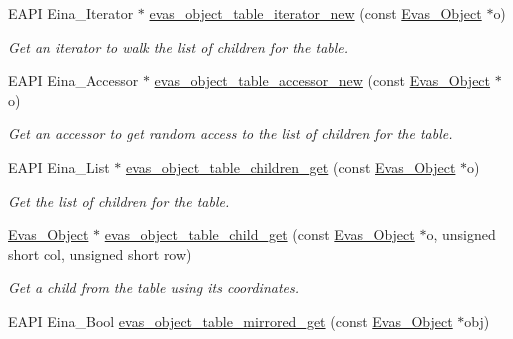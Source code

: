 \begin{DoxyCompactItemize}
EAPI Eina\_\-Iterator $\ast$ \hyperlink{group__Evas__Object__Table_ga07d18d5708745143c4b12280a7359e71}{evas\_\-object\_\-table\_\-iterator\_\-new} (const \hyperlink{group__Evas__Object__Group_ga9e19e6dd1f517a0ba437c0114d3e7c97}{Evas\_\-Object} $\ast$o)
\begin{DoxyCompactList}\small\item\em Get an iterator to walk the list of children for the table. \item\end{DoxyCompactList}\item 
EAPI Eina\_\-Accessor $\ast$ \hyperlink{group__Evas__Object__Table_gaaa6c5242faad0906b1fbf4bbc1088543}{evas\_\-object\_\-table\_\-accessor\_\-new} (const \hyperlink{group__Evas__Object__Group_ga9e19e6dd1f517a0ba437c0114d3e7c97}{Evas\_\-Object} $\ast$o)
\begin{DoxyCompactList}\small\item\em Get an accessor to get random access to the list of children for the table. \item\end{DoxyCompactList}\item 
EAPI Eina\_\-List $\ast$ \hyperlink{group__Evas__Object__Table_ga1afb562131cd3a74a130c374fcea0632}{evas\_\-object\_\-table\_\-children\_\-get} (const \hyperlink{group__Evas__Object__Group_ga9e19e6dd1f517a0ba437c0114d3e7c97}{Evas\_\-Object} $\ast$o)
\begin{DoxyCompactList}\small\item\em Get the list of children for the table. \item\end{DoxyCompactList}\item 
\hyperlink{group__Evas__Object__Group_ga9e19e6dd1f517a0ba437c0114d3e7c97}{Evas\_\-Object} $\ast$ \hyperlink{group__Evas__Object__Table_gaeb4a9d107dde8a4c7bc60d6f97b5ec46}{evas\_\-object\_\-table\_\-child\_\-get} (const \hyperlink{group__Evas__Object__Group_ga9e19e6dd1f517a0ba437c0114d3e7c97}{Evas\_\-Object} $\ast$o, unsigned short col, unsigned short row)
\begin{DoxyCompactList}\small\item\em Get a child from the table using its coordinates. \item\end{DoxyCompactList}\item 
EAPI Eina\_\-Bool \hyperlink{group__Evas__Object__Table_gac008b924a1ba3b0133d0ac11b3e6af06}{evas\_\-object\_\-table\_\-mirrored\_\-get} (const \hyperlink{group__Evas__Object__Group_ga9e19e6dd1f517a0ba437c0114d3e7c97}{Evas\_\-Object} $\ast$obj)

\end{DoxyCompactItemize}
